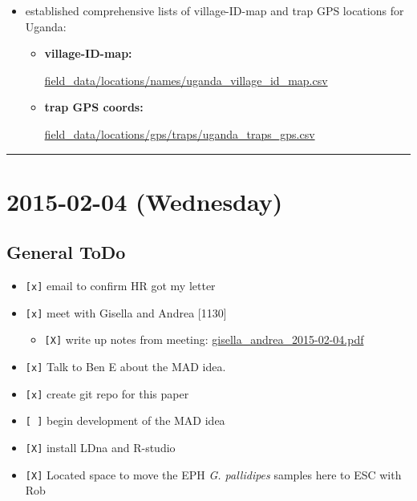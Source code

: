 \documentclass[letterpaper]{scrartcl}
\begin{document}
\begin{itemize}
\itemsep1pt\parskip0pt
\item
  established comprehensive lists of village-ID-map and trap GPS
  locations for Uganda:

  \begin{itemize}
  \item
    \textbf{village-ID-map:}

    \href{file:///home/gus/Dropbox/uganda_data/data_repos/field_data/locations/names/uganda_village_id_map.csv}{field\_data/locations/names/uganda\_village\_id\_map.csv}
  \item
    \textbf{trap GPS coords:}

    \href{file:///home/gus/Dropbox/uganda_data/data_repos/field_data/locations/gps/traps/uganda_traps_gps.csv}{field\_data/locations/gps/traps/uganda\_traps\_gps.csv}
  \end{itemize}
\end{itemize}

\begin{center}\rule{0.5\linewidth}{\linethickness}\end{center}

\section{2015-02-04 (Wednesday)}\label{wednesday}

\subsection{General ToDo}\label{general-todo}

\begin{itemize}
\itemsep1pt\parskip0pt
\item
  \texttt{{[}x{]}} email to confirm HR got my letter
\item
  \texttt{{[}x{]}} meet with Gisella and Andrea {[}1130{]}

  \begin{itemize}
  \itemsep1pt\parskip0pt
  \item
    \texttt{{[}X{]}} write up notes from meeting:
    \href{file:///home/gus/Dropbox/repos/git/markdown-docs/notes/meetings/gisella_andrea_2015-02-04/gisella_andrea_2015-02-04.pdf}{gisella\_andrea\_2015-02-04.pdf}
  \end{itemize}
\item
  \texttt{{[}x{]}} Talk to Ben E about the MAD idea.
\item
  \texttt{{[}x{]}} create git repo for this paper
\item
  \texttt{{[} {]}} begin development of the MAD idea
\item
  \texttt{{[}X{]}} install LDna and R-studio
\item
  \texttt{{[}X{]}} Located space to move the EPH \emph{G. pallidipes}
  samples here to ESC with Rob
\end{itemize}
\end{document}
